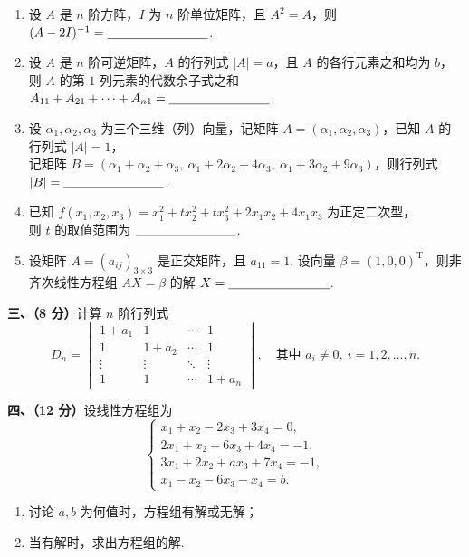 \documentclass[a4paper,11pt]{ctexart}
\newcommand{\T}{\mathrm{T}}
\newcommand{\blank}[1][2.8cm]{\underline{\hspace{#1}}}
\begin{document}
\begin{enumerate}[label=\arabic*., leftmargin=2em, itemsep=0.9em, topsep=0.5em]
  \item 设 $A$ 是 $n$ 阶方阵，$I$ 为 $n$ 阶单位矩阵，且 $A^2 = A$，则 $(A - 2I)^{-1} = \blank$.

  \item 设 $A$ 是 $n$ 阶可逆矩阵，$A$ 的行列式 $|A| = a$，且 $A$ 的各行元素之和均为 $b$，则 $A$ 的第 $1$ 列元素的代数余子式之和 $A_{11} + A_{21} + \dots + A_{n1} = \blank$.

  \item 设 $\alpha_1, \alpha_2, \alpha_3$ 为三个三维（列）向量，记矩阵 $A = (\alpha_1, \alpha_2, \alpha_3)$，已知 $A$ 的行列式 $|A| = 1$，\\
  记矩阵 $B = (\alpha_1 + \alpha_2 + \alpha_3,\ \alpha_1 + 2\alpha_2 + 4\alpha_3,\ \alpha_1 + 3\alpha_2 + 9\alpha_3)$，则行列式 $|B| = \blank$.

  \item 已知 $f(x_1, x_2, x_3) = x_1^2 + t x_2^2 + t x_3^2 + 2 x_1 x_2 + 4 x_1 x_3$ 为正定二次型，\\
  则 $t$ 的取值范围为 $\blank$.

  \item 设矩阵 $A = (a_{ij})_{3 \times 3}$ 是正交矩阵，且 $a_{11} = 1$. 设向量 $\beta = (1, 0, 0)^{\T}$，则非齐次线性方程组 $AX = \beta$ 的解 $X = \blank$.
\end{enumerate}

\vspace{0.9em}

\textbf{三、（8 分）}计算 $n$ 阶行列式
\[
  D_n = \begin{vmatrix}
    1 + a_1 & 1 & \cdots & 1 \\
    1 & 1 + a_2 & \cdots & 1 \\
    \vdots & \vdots & \ddots & \vdots \\
    1 & 1 & \cdots & 1 + a_n
  \end{vmatrix},
  \quad\text{其中 } a_i \neq 0,\ i = 1, 2, \dots, n.
\]

\vspace{0.7em}

\textbf{四、（12 分）}设线性方程组为
\[
  \begin{cases}
    x_1 + x_2 - 2x_3 + 3x_4 = 0, \\
    2x_1 + x_2 - 6x_3 + 4x_4 = -1, \\
    3x_1 + 2x_2 + a x_3 + 7x_4 = -1, \\
    x_1 - x_2 - 6x_3 - x_4 = b.
  \end{cases}
\]
\begin{enumerate}[label=(\arabic*), leftmargin=2.4em, itemsep=0.25em, topsep=0.3em]
  \item 讨论 $a, b$ 为何值时，方程组有解或无解；
  \item 当有解时，求出方程组的解.
\end{enumerate}
\end{document}
